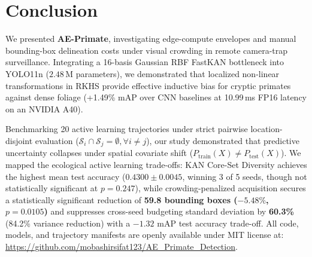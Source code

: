 \documentclass[conference]{IEEEtran}
\newif\ifanonymous
\begin{document}
\section{Conclusion}
We presented \textbf{AE-Primate}, investigating edge-compute envelopes and manual bounding-box delineation costs under visual crowding in remote camera-trap surveillance. Integrating a 16-basis Gaussian RBF FastKAN bottleneck into YOLO11n ($2.48\,$M parameters), we demonstrated that localized non-linear transformations in RKHS provide effective inductive bias for cryptic primates against dense foliage (+1.49\% mAP over CNN baselines at 10.99\,ms FP16 latency on an NVIDIA A40).

Benchmarking 20 active learning trajectories under strict pairwise location-disjoint evaluation ($\mathcal{S}_i \cap \mathcal{S}_j = \emptyset, \forall i \ne j$), our study demonstrated that predictive uncertainty collapses under spatial covariate shift ($P_{\text{train}}(X) \neq P_{\text{test}}(X)$). We mapped the ecological active learning trade-offs: KAN Core-Set Diversity achieves the highest mean test accuracy ($0.4300 \pm 0.0045$, winning 3 of 5 seeds, though not statistically significant at $p=0.247$), while crowding-penalized acquisition secures a statistically significant reduction of \textbf{59.8 bounding boxes ($-5.48\%$, $p=0.0105$)} and suppresses cross-seed budgeting standard deviation by \textbf{60.3\%} (84.2\% variance reduction) with a $-1.32$ mAP test accuracy trade-off. All code, models, and trajectory manifests are openly available under MIT license at: \ifanonymous \url{https://anonymous.4open.science/r/AE_Primate_Detection-anon}\else \url{https://github.com/mobashirsifat123/AE_Primate_Detection}\fi.
\end{document}
